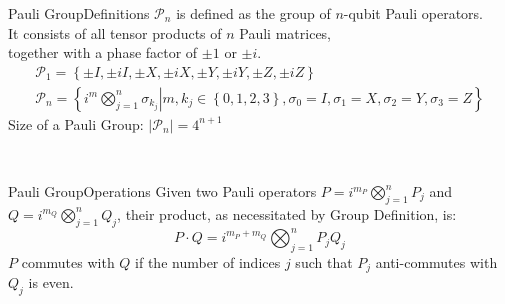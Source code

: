 \begin{frame}{Pauli Group}{Definitions}
    \(\mathcal{P}_n\)
    is defined as the group of \(n\)-qubit Pauli operators. \\
    It consists of all tensor products of \(n\) Pauli matrices, \\
    together with a phase factor of \(\pm 1\) or \(\pm i\).
    \begin{gather*}
        \mathcal{P}_1=\left\{
        \pm I,\pm iI,
        \pm X,\pm iX,
        \pm Y,\pm iY,
        \pm Z,\pm iZ
        \right\} \\
        \mathcal{P}_n
        =\left\{
        \left.
        i^m\bigotimes_{j=1}^n\sigma_{k_j}
        \right|
        m,k_j\in\left\{0,1,2,3\right\},
        \sigma_0=I,
        \sigma_1=X,
        \sigma_2=Y,
        \sigma_3=Z
        \right\}
    \end{gather*}
    \newline
    Size of a Pauli Group:
    \(\left|\mathcal{P}_n\right|=4^{n+1}\)

    \vspace*{5mm}

     \\
\end{frame}

\begin{frame}{Pauli Group}{Operations}
    Given two Pauli operators
    \(P=i^{m_P}\bigotimes_{j=1}^{n}P_j\)
    and
    \(Q=i^{m_Q}\bigotimes_{j=1}^{n}Q_j\),
    their product, as necessitated by Group Definition, is:
    \[
        P\cdot Q=i^{m_P+m_Q}\bigotimes_{j=1}^{n}P_jQ_j
    \]
    \newline
    \(P\) commutes with \(Q\) if the number of indices \(j\) such that \(P_j\) anti-commutes with \(Q_j\) is even.

    \vspace*{25mm}

\end{frame}
